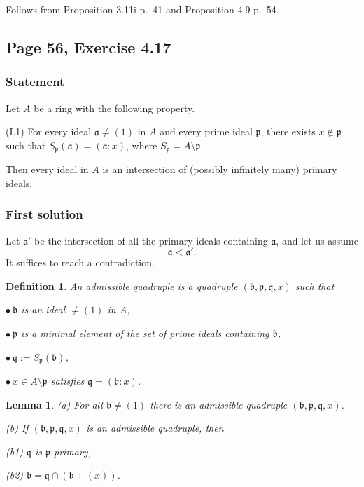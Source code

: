 \documentclass[parskip=half,fontsize=12pt]{scrartcl}%
\newcommand{\mf}{\mathfrak}
\newcommand{\aaa}{\mf a}
\newcommand{\bbb}{\mf b}
\newcommand{\ppp}{\mf p}
\newcommand{\qqq}{\mf q}
\newcommand{\bu}{\bullet}
\newtheorem{df}[thm]{Definition}
\newtheorem{lem}[thm]{Lemma}
\begin{document}
Follows from Proposition 3.11i p.~41 and Proposition 4.9 p.~54.

\subsection{Page 56, Exercise 4.17}%

\subsubsection{Statement}\label{417}%

Let $A$ be a ring with the following property.

(L1) For every ideal $\mathfrak a\ne(1)$ in $A$ and every prime ideal $\mathfrak p$, there exists $x\notin\mathfrak p$ such that $S_{\mathfrak p}(\mathfrak a)=(\mathfrak a:x)$, where $S_{\mathfrak p}=A\setminus\mathfrak p$.

Then every ideal in $A$ is an intersection of (possibly infinitely many) primary ideals.

\subsubsection{First solution}%

Let $\aaa'$ be the intersection of all the primary ideals containing $\aaa$, and let us assume  
\begin{equation}\label{abs417}
\aaa<\aaa'.
\end{equation} 
It suffices to reach a contradiction.

\begin{df} 
An \emph{admissible quadruple} is a quadruple $(\bbb,\ppp,\qqq,x)$ such that 

$\bu\ \bbb$ is an ideal $\ne(1)$ in $A$, 

$\bu\ \mathfrak p$ is a minimal element of the set of prime ideals containing $\bbb$, 

$\bu\ \mathfrak q:=S_{\mathfrak p}(\bbb)$, 

$\bu\ x\in A\setminus\ppp$ satisfies $\mathfrak q=(\bbb:x)$. 
\end{df}

\begin{lem}\label{l417}
 \emph{(a)} For all $\bbb\ne(1)$ there is an admissible quadruple $(\bbb,\ppp,\qqq,x)$.

\emph{(b)} If $(\bbb,\ppp,\qqq,x)$ is an admissible quadruple, then 

\emph{(b1)} $\mathfrak q$ is $\mathfrak p$-primary, 

\emph{(b2)} $\bbb=\mathfrak q\cap(\bbb+(x))$.
\end{lem}
\end{document}
